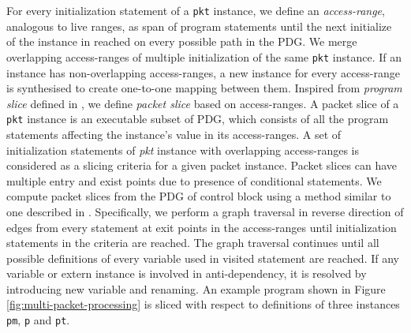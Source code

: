 \documentclass[letterpaper,twocolumn,10pt]{article}
\begin{document}
For every initialization statement of a \texttt{pkt} instance, we define an \emph{access-range}, analogous to live ranges, as span of program statements until the next initialize of the instance in reached on every possible path in the PDG.
We merge overlapping access-ranges of multiple initialization of the same \texttt{pkt} instance.
If an instance has non-overlapping access-ranges, a new instance for every access-range is synthesised to create one-to-one mapping between them.
Inspired from \emph{program slice} defined in \cite{Weiser:1981:PS:800078.802557}, we define \emph{packet slice} based on access-ranges.
A packet slice of a \texttt{pkt} instance is an executable subset of PDG, which consists of all the program statements affecting the instance's value in its access-ranges.
A set of initialization statements of \emph{pkt} instance with overlapping access-ranges is considered as a slicing criteria for a given packet instance.
Packet slices can have multiple entry and exist points due to presence of conditional statements.
We compute packet slices from the PDG of control block using a method similar to one described in \cite{Ferrante:1987:PDG:24039.24041}.
Specifically, we perform a graph traversal in reverse direction of edges from every statement at exit points in the access-ranges until initialization statements in the criteria are reached.
The graph traversal continues until all possible definitions of every variable used in visited statement are reached.
If any variable or extern instance is involved in anti-dependency, it is resolved by introducing new variable and renaming.
An example program shown in Figure \ref{fig:multi-packet-processing} is sliced with respect to definitions of three instances \texttt{pm}, \texttt{p} and \texttt{pt}.
\end{document}
